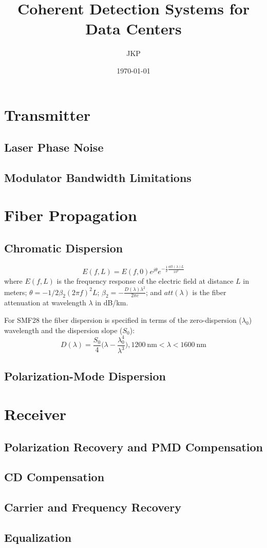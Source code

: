 \documentclass[a4paper]{article}
\title{Coherent Detection Systems for Data Centers}
\author{JKP}
\date{\today}
\begin{document}
\maketitle

\section{Transmitter}
\subsection{Laser Phase Noise}
\subsection{Modulator Bandwidth Limitations}


\section{Fiber Propagation}
\subsection{Chromatic Dispersion}
\begin{equation}
E(f, L) = E(f, 0)e^{j\theta}e^{-\frac{1}{2}\frac{att(\lambda)L}{10^4}}
\end{equation}
where $E(f, L)$ is the frequency response of the electric field at distance $L$ in meters; $\theta = -1/2\beta_2(2\pi f)^2L$; $\beta_2 = -\frac{D(\lambda)\lambda^2}{2\pi c}$; and $att(\lambda)$ is the fiber attenuation at wavelength $\lambda$ in dB/km.

For SMF28 the fiber dispersion is specified in terms of the zero-dispersion ($\lambda_0$) wavelength and the dispersion slope ($S_0$):
\begin{equation}
D(\lambda) = \frac{S_0}{4}\bigg(\lambda - \frac{\lambda_0^4}{\lambda^3}\bigg), 1200~\text{nm} < \lambda < 1600~\text{nm}
\end{equation}

\subsection{Polarization-Mode Dispersion}

\section{Receiver}
\subsection{Polarization Recovery and PMD Compensation}
\subsection{CD Compensation}
\subsection{Carrier and Frequency Recovery}
\subsection{Equalization}



\begin{thebibliography}{9}




\end{thebibliography}
\end{document}
